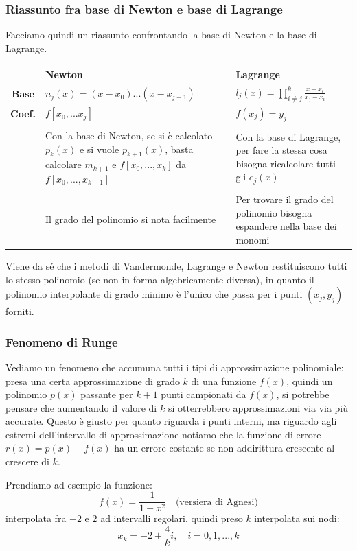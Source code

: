 \documentclass[a4paper,11pt]{article}
\begin{document}
\subsubsection{Riassunto fra base di Newton e base di Lagrange}
Facciamo quindi un riassunto confrontando la base di Newton e la base di Lagrange.
\begin{table}[h!]
	\center 
	\begin{tabular} { c p{6cm} | p{6cm} }
		& \bfseries Newton & \bfseries Lagrange \\
		\hline
		\bfseries Base & $n_j(x) = (x - x_0) ... (x - x_{j - 1}) $ & $l_j(x) = \prod_{i \neq j}^k \frac{x - x_i}{x_j - x_i}$ \\
		\bfseries Coef. & $f[x_0, ... x_j]$ & $f(x_j) = y_j$ \\ & \\
		& Con la base di Newton, se si è calcolato $p_k(x)$ e si vuole $p_{k + 1}(x)$, basta calcolare $m_{k + 1}$ e $f[x_0, ..., x_{k}]$ da $f[x_0, ..., x_{k - 1}]$ &
		Con la base di Lagrange, per fare la stessa cosa bisogna ricalcolare tutti gli $e_j(x)$ \\ & \\
		& Il grado del polinomio si nota facilmente & Per trovare il grado del polinomio bisogna espandere nella base dei monomi
	\end{tabular}
\end{table}

Viene da sé che i metodi di Vandermonde, Lagrange e Newton restituiscono tutti lo stesso polinomio (se non in forma algebricamente diversa), in quanto il polinomio interpolante di grado minimo è l'unico che passa per i punti $(x_j, y_j)$ forniti.

\subsubsection{Fenomeno di Runge}
Vediamo un fenomeno che accumuna tutti i tipi di approssimazione polinomiale: presa una certa approssimazione di grado $k$ di una funzione $f(x)$, quindi un polinomio $p(x)$ passante per $k + 1$ punti campionati da $f(x)$, si potrebbe pensare che aumentando il valore di $k$ si otterrebbero approssimazioni via via più accurate.
Questo è giusto per quanto riguarda i punti interni, ma riguardo agli estremi dell'intervallo di approssimazione notiamo che la funzione di errore $r(x) = p(x) - f(x)$ ha un errore costante se non addirittura crescente al crescere di $k$.

Prendiamo ad esempio la funzione:
$$
f(x) = \frac{1}{1 + x^2} \quad \text{(versiera di Agnesi)}
$$
interpolata fra $-2$ e $2$ ad intervalli regolari, quindi preso $k$ interpolata sui nodi:
$$
x_k = -2 + \frac{4}{k}i, \quad i = 0, 1, ..., k
$$
\end{document}
